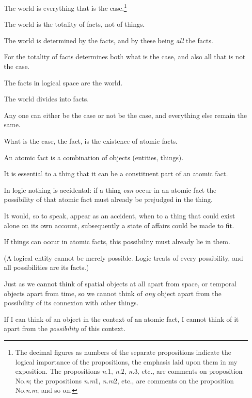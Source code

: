 {The world is everything that is the case.\footnote{The decimal figures as numbers of the separate propositions indicate the logical
importance of the propositions, the emphasis laid upon them in my exposition.
The propositions \textit{n}.1, \textit{n}.2, \textit{n}.3, etc., are comments on proposition No.\;\textit{n}; the propositions
\textit{n}.\textit{m}1, \textit{n}.\textit{m}2, etc., are comments on the proposition No.\;\textit{n}.\textit{m}; and so on.}}


{The world is the totality of facts, not of
things.}


{The world is determined by the facts, and by
these being \emph{all} the facts.}


{For the totality of facts determines both what is
the case, and also all that is not the case.}


{The facts in logical space are the world.}


{The world divides into facts.}


{Any one can either be the case or not be the
case, and everything else remain the same.}


{What is the case, the fact, is the existence of
atomic facts.}


{An atomic fact is a combination of objects
(entities, things).}


{It is essential to a thing that it can be a constituent
part of an atomic fact.}


{In logic nothing is accidental: if a thing \emph{can}
occur in an atomic fact the possibility of that
atomic fact must already be prejudged in the
thing.}


{It would, so to speak, appear as an accident, when
to a thing that could exist alone on its own account,
subsequently a state of affairs could be made to fit.

If things can occur in atomic facts, this possibility
must already lie in them.

(A logical entity cannot be merely possible.
Logic treats of every possibility, and all possibilities
are its facts.)

Just as we cannot think of spatial objects at
all apart from space, or temporal objects apart
from time, so we cannot think of \emph{any} object apart
from the possibility of its connexion with other
things.

If I can think of an object in the context of an
atomic fact, I cannot think of it apart from the
\emph{possibility} of this context.}



